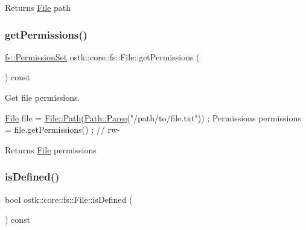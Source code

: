 \begin{DoxyReturn}{Returns}
\hyperlink{classostk_1_1core_1_1fs_1_1_file}{File} path 
\end{DoxyReturn}
\mbox{\label{classostk_1_1core_1_1fs_1_1_file_aded4a0f23b9c81f12e2ce3f4e95f3bd0}} 
\subsubsection{\texorpdfstring{get\+Permissions()}{getPermissions()}}
{\footnotesize\ttfamily \hyperlink{classostk_1_1core_1_1fs_1_1_permission_set}{fs\+::\+Permission\+Set} ostk\+::core\+::fs\+::\+File\+::get\+Permissions (\begin{DoxyParamCaption}{ }\end{DoxyParamCaption}) const}



Get file permissions. 


\begin{DoxyCode}
\hyperlink{classostk_1_1core_1_1fs_1_1_file_ad1695224996950be9962b8457da369b3}{File} file = \hyperlink{classostk_1_1core_1_1fs_1_1_file_ad677c6a3edc1e88c18226edebff1da03}{File::Path}(\hyperlink{classostk_1_1core_1_1fs_1_1_path_ad08539ba654f5df11c4bcb07276345ad}{Path::Parse}(\textcolor{stringliteral}{"/path/to/file.txt"})) ;
Permissions permissions = file.getPermissions() ; \textcolor{comment}{// rw-}
\end{DoxyCode}


\begin{DoxyReturn}{Returns}
\hyperlink{classostk_1_1core_1_1fs_1_1_file}{File} permissions 
\end{DoxyReturn}
\mbox{\label{classostk_1_1core_1_1fs_1_1_file_a35d96a10069d22bc45385fdad04bbe00}} 
\subsubsection{\texorpdfstring{is\+Defined()}{isDefined()}}
{\footnotesize\ttfamily bool ostk\+::core\+::fs\+::\+File\+::is\+Defined (\begin{DoxyParamCaption}{ }\end{DoxyParamCaption}) const}



